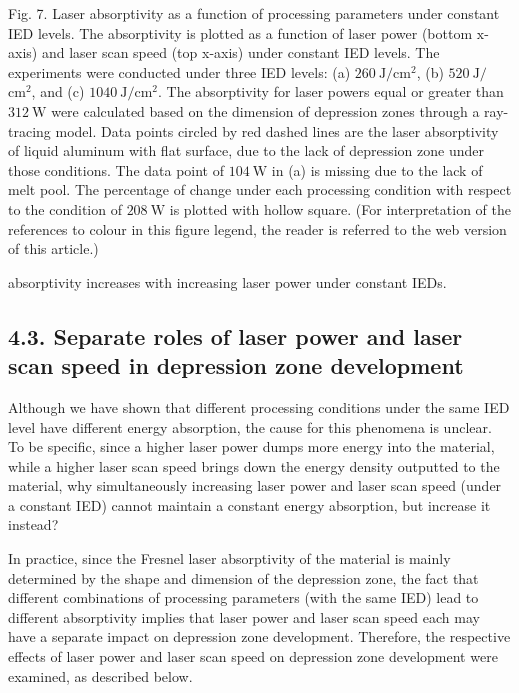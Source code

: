 \documentclass[10pt]{article}
\begin{document}
Fig. 7. Laser absorptivity as a function of processing parameters under constant IED levels. The absorptivity is plotted as a function of laser power (bottom $\mathrm{x}$-axis) and laser scan speed (top x-axis) under constant IED levels. The experiments were conducted under three IED levels: (a) $260 \mathrm{~J} / \mathrm{cm}^{2}$, (b) $520 \mathrm{~J} /$ $\mathrm{cm}^{2}$, and (c) $1040 \mathrm{~J} / \mathrm{cm}^{2}$. The absorptivity for laser powers equal or greater than $312 \mathrm{~W}$ were calculated based on the dimension of depression zones through a ray-tracing model. Data points circled by red dashed lines are the laser absorptivity of liquid aluminum with flat surface, due to the lack of depression zone under those conditions. The data point of $104 \mathrm{~W}$ in (a) is missing due to the lack of melt pool. The percentage of change under each processing condition with respect to the condition of $208 \mathrm{~W}$ is plotted with hollow square. (For interpretation of the references to colour in this figure legend, the reader is referred to the web version of this article.)

absorptivity increases with increasing laser power under constant IEDs.

\subsection*{4.3. Separate roles of laser power and laser scan speed in depression zone development}
Although we have shown that different processing conditions under the same IED level have different energy absorption, the cause for this phenomena is unclear. To be specific, since a higher laser power dumps more energy into the material, while a higher laser scan speed brings down the energy density outputted to the material, why simultaneously increasing laser power and laser scan speed (under a constant IED) cannot maintain a constant energy absorption, but increase it instead?

In practice, since the Fresnel laser absorptivity of the material is mainly determined by the shape and dimension of the depression zone, the fact that different combinations of processing parameters (with the same IED) lead to different absorptivity implies that laser power and laser scan speed each may have a separate impact on depression zone development. Therefore, the respective effects of laser power and laser scan speed on depression zone development were examined, as described below.
\end{document}
